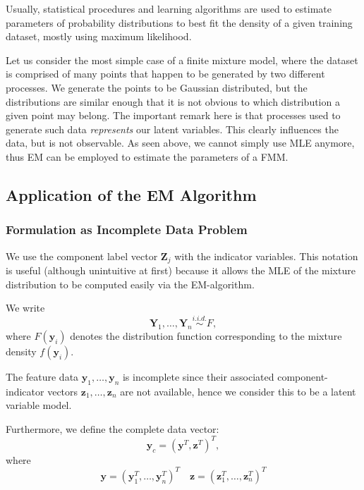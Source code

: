 \documentclass{article}\usepackage[]{graphicx}\usepackage[]{xcolor}
\theoremstyle{plain}
\theoremstyle{definition}
\theoremstyle{remark}
\newcommand{\boldY}{\mathbf{Y}}
\newcommand{\boldZ}{\mathbf{Z}}
\newcommand{\boldz}{\mathbf{z}}
\newcommand{\boldy}{\mathbf{y}}
\begin{document}
Usually, statistical procedures and learning algorithms are used to estimate parameters of probability distributions to best fit the density of a given training dataset, mostly using maximum likelihood.

Let us consider the most simple case of a finite mixture model, where the dataset is comprised of many points that happen to be generated by two different processes. We generate the points to be Gaussian distributed, but the distributions are similar enough that it is not obvious to which distribution a given point may belong. The important remark here is that processes used to generate such data \textit{represents} our latent variables. This clearly influences the data, but is not observable. As seen above, we cannot simply use MLE anymore, thus EM can be employed to estimate the parameters of a FMM.

\subsection{Application of the EM Algorithm}

\subsubsection{Formulation as Incomplete Data Problem} \label{subsec:incomplete}

We use the component label vector $\boldZ_j$ with the indicator variables. This notation is useful (although unintuitive at first) because it allows the MLE of the mixture distribution to be computed easily via the EM-algorithm. 

We write
\begin{equation}
    \boldY_1, \dots, \boldY_n   \stackrel{i.i.d.}{\sim} F,
\end{equation}
where $F(\boldy_i)$ denotes the distribution function corresponding to the mixture density $f(\boldy_i)$.

The feature data $\boldy_1, \dots, \boldy_n$ is incomplete since their associated component-indicator vectors $\boldz_1, \dots, \boldz_n$ are not available, hence we consider this to be a latent variable model.

Furthermore, we define the complete data vector:
\begin{equation} \label{eq:ycomplete}
    \boldy_c = (\boldy^T, \boldz^T)^T,
\end{equation}
where
\begin{equation}
    \boldy = (\boldy_1^T, \dots, \boldy_n^T)^T \quad \boldz = (\boldz_1^T, \dots, \boldz_n^T)^T
\end{equation}
\end{document}
